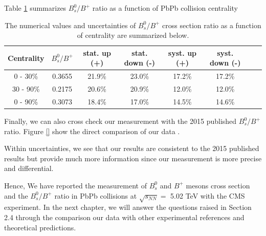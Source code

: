 Table \ref{BsBPPtCMS} summarizes $B^0_s/B^+$ ratio as a function of PbPb collision centrality


\begin{table}[h]
\begin{center}
\caption{The numerical values and uncertainties of $B^0_s/B^+$ cross section ratio as a function of centrality are summarized below.}
\vspace{1em}
\label{BsBPPtCMS}
  \begin{tabular}{| c | c |c | c| c| c| c| c|}
    \hline
Centrality & $B^0_s/B^+$ & stat. up (+) & stat. down (-)  & syst. up (+) & syst. down (-)  \\
    \hline
    \hline
    0 - 30\%  & 0.3655  & 21.9\%  & 23.0\% &  17.2\% & 17.2\% \\
    30 - 90\%  &  0.2175 & 20.6\% & 20.9\% &  12.0\%  & 12.0\%   \\
      0 - 90\%  & 0.3073   & 18.4\%  & 17.0\% &  14.5\% & 14.6\% \\
    \hline
    \hline
\end{tabular}
\end{center}
\end{table}

Finally, we can also cross check our measurement with the 2015 published $B^0_s/B^+$ ratio. Figure \ref{} show the direct comparison of our data .


Within uncertainties, we see that our results are consistent to the 2015 published results but provide much more information since our measurement is more precise and differential.  

Hence, We have reported the measurement of $B^0_s$ and $B^+$ mesons cross section and the $B^0_s/B^+$ ratio in PbPb collisions at $\sqrt{s_{NN}} =$ 5.02 TeV with the CMS experiment. In the next chapter, we will answer the questions raised in Section 2.4 through the comparison our data with other experimental references and theoretical predictions. 




